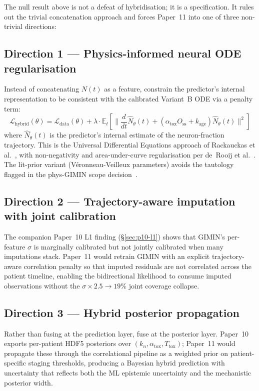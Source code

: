 The null result above is not a defeat of hybridisation; it is a specification. It rules out the trivial concatenation approach and forces Paper~11 into one of three non-trivial directions:

\subsection{Direction 1 --- Physics-informed neural ODE regularisation}

Instead of concatenating $N(t)$ as a feature, constrain the predictor's internal representation to be consistent with the calibrated Variant~B ODE via a penalty term:
\begin{equation}
\mathcal{L}_\text{hybrid}(\theta) = \mathcal{L}_\text{data}(\theta) + \lambda \cdot \mathbb{E}_{t}\!\left[\bigl\|\frac{d}{dt}\hat{N}_\theta(t) + (\alpha_\text{tox} O_\text{ss} + k_\text{age})\hat{N}_\theta(t)\bigr\|^2\right]
\label{eq:p11-regularisation}
\end{equation}
where $\hat{N}_\theta(t)$ is the predictor's internal estimate of the neuron-fraction trajectory. This is the Universal Differential Equations approach of Rackauckas et al.~\cite{rackauckas2020universal}, with non-negativity and area-under-curve regularisation per de~Rooij et al.~\cite{deRooij2025physiology}. The lit-prior variant (Véronneau-Veilleux parameters) avoids the tautology flagged in the phys-GIMIN scope decision~\cite{phys_gimin_scope}.

\subsection{Direction 2 --- Trajectory-aware imputation with joint calibration}

The companion Paper~10 L1 finding (\S\ref{sec:p10-l1}) shows that GIMIN's per-feature $\sigma$ is marginally calibrated but not jointly calibrated when many imputations stack. Paper~11 would retrain GIMIN with an explicit trajectory-aware correlation penalty so that imputed residuals are not correlated across the patient timeline, enabling the bidirectional likelihood to consume imputed observations without the $\sigma \times 2.5 \to 19\%$ joint coverage collapse.

\subsection{Direction 3 --- Hybrid posterior propagation}

Rather than fusing at the prediction layer, fuse at the posterior layer. Paper~10 exports per-patient HDF5 posteriors over $(k_n, \alpha_\text{tox}, T_\text{tox})$; Paper~11 would propagate these through the correlational pipeline as a weighted prior on patient-specific staging thresholds, producing a Bayesian hybrid prediction with uncertainty that reflects both the ML epistemic uncertainty and the mechanistic posterior width.

